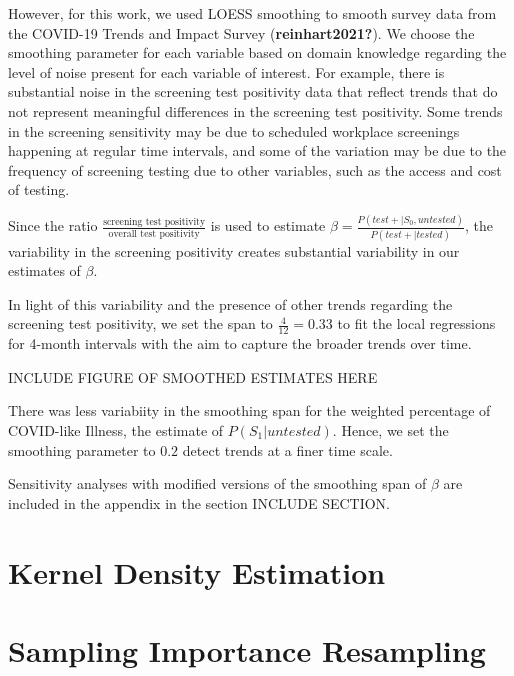 \documentclass[12pt,twoside]{smiththesis}
\begin{document}
However, for this work, we used LOESS smoothing to smooth survey data from the COVID-19 Trends and Impact Survey (\textbf{reinhart2021?}).
We choose the smoothing parameter for each variable based on domain knowledge regarding the level of noise present for each variable of interest. For example, there is substantial noise in the screening test positivity data that reflect trends that do not represent meaningful differences in the screening test positivity. Some trends in the screening sensitivity may be due to scheduled workplace screenings happening at regular time intervals, and some of the variation may be due to the frequency of screening testing due to other variables, such as the access and cost of testing.

Since the ratio \(\frac{\text{screening test positivity}}{\text{overall test positivity}}\) is used to estimate \(\beta = \frac{P(test + | S_0, untested)}{P(test + |tested)}\), the variability in the screening positivity creates substantial variability in our estimates of \(\beta\).

In light of this variability and the presence of other trends regarding the screening test positivity, we set the span to \(\frac{4}{12} = 0.33\) to fit the local regressions for 4-month intervals with the aim to capture the broader trends over time.

INCLUDE FIGURE OF SMOOTHED ESTIMATES HERE

There was less variabiity in the smoothing span for the weighted percentage of COVID-like Illness, the estimate of \(P(S_1|untested)\). Hence, we set the smoothing parameter to \(0.2\) detect trends at a finer time scale.

Sensitivity analyses with modified versions of the smoothing span of \(\beta\) are included in the appendix in the section INCLUDE SECTION.

\newpage

\hypertarget{kernel-density-estimation}{%
\section{Kernel Density Estimation}\label{kernel-density-estimation}}

\hypertarget{sampling-importance-resampling}{%
\section{Sampling Importance Resampling}\label{sampling-importance-resampling}}
\end{document}
